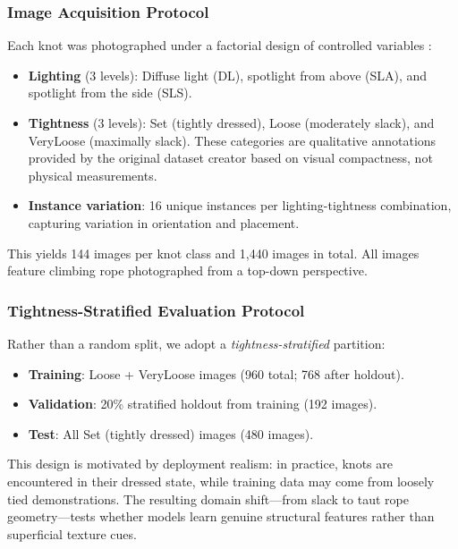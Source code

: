 \documentclass[preprint,review,12pt]{elsarticle}
\begin{document}
\subsubsection{Image Acquisition Protocol}

Each knot was photographed under a factorial design of controlled variables \citep{cameron2018tenknots}:

\begin{itemize}
    \item \textbf{Lighting} (3 levels): Diffuse light (DL), spotlight from above (SLA), and spotlight from the side (SLS).
    \item \textbf{Tightness} (3 levels): Set (tightly dressed), Loose (moderately slack), and VeryLoose (maximally slack). These categories are qualitative annotations provided by the original dataset creator based on visual compactness, not physical measurements.
    \item \textbf{Instance variation}: 16 unique instances per lighting-tightness combination, capturing variation in orientation and placement.
\end{itemize}

This yields 144 images per knot class and 1{,}440 images in total. All images feature climbing rope photographed from a top-down perspective.

\subsubsection{Tightness-Stratified Evaluation Protocol}

Rather than a random split, we adopt a \emph{tightness-stratified} partition:

\begin{itemize}
    \item \textbf{Training}: Loose + VeryLoose images (960 total; 768 after holdout).
    \item \textbf{Validation}: 20\% stratified holdout from training (192 images).
    \item \textbf{Test}: All Set (tightly dressed) images (480 images).
\end{itemize}

This design is motivated by deployment realism: in practice, knots are encountered in their dressed state, while training data may come from loosely tied demonstrations. The resulting domain shift---from slack to taut rope geometry---tests whether models learn genuine structural features rather than superficial texture cues.
\end{document}
